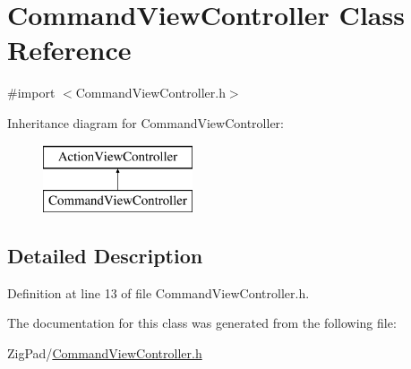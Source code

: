 \hypertarget{interface_command_view_controller}{
\section{CommandViewController Class Reference}
\label{interface_command_view_controller}
}


{\ttfamily \#import $<$CommandViewController.h$>$}

Inheritance diagram for CommandViewController:\begin{figure}[H]
\begin{center}
\leavevmode
\includegraphics[height=2.000000cm]{interface_command_view_controller}
\end{center}
\end{figure}


\subsection{Detailed Description}


Definition at line 13 of file CommandViewController.h.



The documentation for this class was generated from the following file:\begin{DoxyCompactItemize}
\item 
ZigPad/\hyperlink{_command_view_controller_8h}{CommandViewController.h}\end{DoxyCompactItemize}
